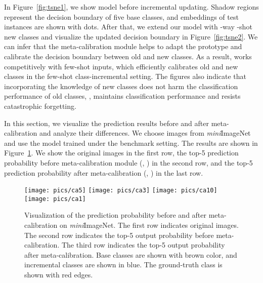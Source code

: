 In Figure~\ref{fig:tsne1}, we show model before incremental updating. 
Shadow regions represent the decision boundary of five base classes, and embeddings of test instances are shown with dots.
After that, we extend our model with -way -shot new classes and visualize the updated decision boundary in Figure~\ref{fig:tsne2}. We can infer that the meta-calibration module helps to adapt the prototype and calibrate the decision boundary between old and new classes. 
As a result,  \name works competitively with few-shot inputs, which efficiently calibrates old and new classes in the few-shot class-incremental setting. The figures also indicate that incorporating  the knowledge of new classes does not harm the classification performance of old classes, \ie, \name maintains classification performance and resists catastrophic forgetting.







In this section, we visualize the prediction results before and after meta-calibration and analyze their differences. We choose images from \textit{mini}ImageNet and use the model trained under the benchmark setting. The results are shown in Figure~\ref{figure:meta-calibration}. We show the original images in the first row, the top-5 prediction probability before meta-calibration module (\ie, ) in the second row, and the top-5 prediction probability after meta-calibration (\ie, ) in the last row.



\begin{figure}[t]
	\begin{center}
		
		
		{	
			\texttt{[image: pics/ca5]}
			\texttt{[image: pics/ca3]}
			\texttt{[image: pics/ca10]}
			\texttt{[image: pics/ca1]}
			
			
			
			
		}
		
	\end{center}
\caption{ Visualization of the prediction probability before and after meta-calibration on \textit{mini}ImageNet. The first row indicates original images. The second row indicates the top-5 output probability before meta-calibration. The third row indicates the top-5 output probability after meta-calibration.
		Base classes are shown with brown color, and incremental classes are shown in blue. The ground-truth class is shown with red edges.
	} \label{figure:meta-calibration}
\end{figure}


